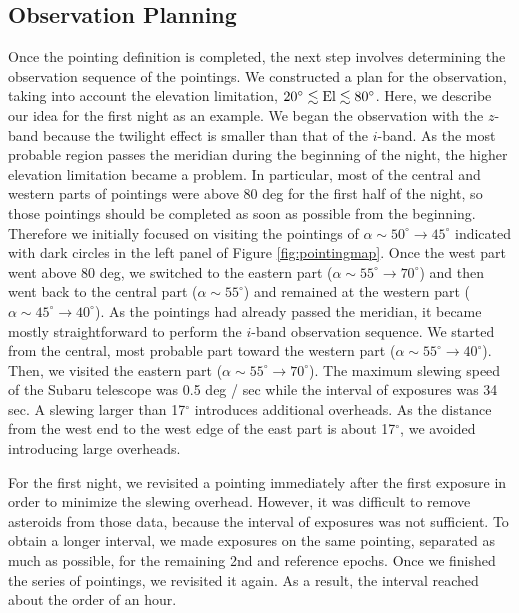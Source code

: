 \documentclass[]{pasj01}
\begin{document}
\begin{appendix}
\section{Observation Planning}\label{plan}
Once the pointing definition is completed, the next step involves determining the observation sequence of the pointings.
We constructed  a plan for the observation, taking into account the elevation limitation, $20^{\circ}\lesssim {\rm El} \lesssim 80^{\circ}$.
Here, we describe our idea for the first night as an example.
We began the observation with the $z$-band because the twilight effect is smaller than that of the $i$-band.
As the most probable region passes the meridian during the beginning of the night,
the higher elevation limitation became a problem.
In particular, most of the central and western parts of pointings were above 80 deg for the first half of the night,
so those pointings should be completed as soon as possible from the beginning.
Therefore we initially focused on visiting the pointings of $\alpha\sim 50^{\circ}\rightarrow 45^{\circ}$ indicated with dark circles in the left panel of Figure \ref{fig:pointingmap}.
Once the west part went above 80 deg, we switched to the eastern part ($\alpha\sim 55^{\circ}\rightarrow70^{\circ}$)
and then went back to the central part ($\alpha\sim 55^{\circ}$) and remained at the western part ($\alpha\sim 45^{\circ}\rightarrow 40^{\circ}$).
As the pointings had already passed the meridian, it became mostly straightforward to perform the $i$-band observation sequence.
We started from the central, most probable part toward the western part ($\alpha\sim 55^{\circ}\rightarrow 40^{\circ}$).
Then, we visited the eastern part  ($\alpha\sim 55^{\circ}\rightarrow 70^{\circ}$).
The maximum slewing speed of the Subaru telescope was 0.5 deg / sec while the interval of exposures was 34 sec.
A slewing larger than 17$^{\circ}$ introduces additional overheads.
As the distance from the west end to the west edge of the east part is about 17$^{\circ}$,
we avoided introducing large overheads.

For the first night, we revisited a pointing immediately after the first exposure in order to minimize the slewing overhead.
However, it was difficult to remove asteroids from those data, because the interval of exposures was not sufficient.
To obtain a longer interval, we made exposures on the same pointing, separated as much as possible,
for the remaining 2nd and reference epochs. Once we finished the series of pointings, we revisited it again. 
As a result, the interval reached about the order of an hour.
\end{appendix}



\end{document}
